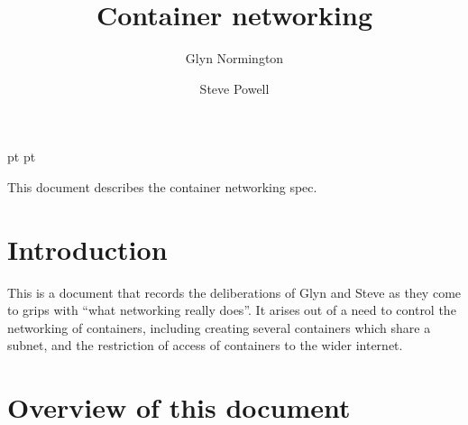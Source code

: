 \documentclass[a4paper,twoside,12pt]{article}
\begin{document}
 pt
 pt

\def\Slash{\slash\hspace{0pt}}

\title{Container networking}

\author{
Glyn Normington\and
Steve Powell
}

\maketitle
\thispagestyle{empty}
\setcounter{page}{1}


This document describes the container networking spec.


\newcommand{\true}{true}
\newcommand{\false}{false}
\renewcommand{\emptyset}{\varnothing}

\clearpage
\tableofcontents

\cleardoublepage
{}
\setcounter{page}{1}

\section{Introduction}

This is a document that records the deliberations of Glyn and Steve as they come to grips with ``what networking really
does''. It arises out of a need to control the networking of containers, including creating several containers which share a subnet, and the restriction of access of containers to the wider internet.

\section{Overview of this document}
\end{document}
